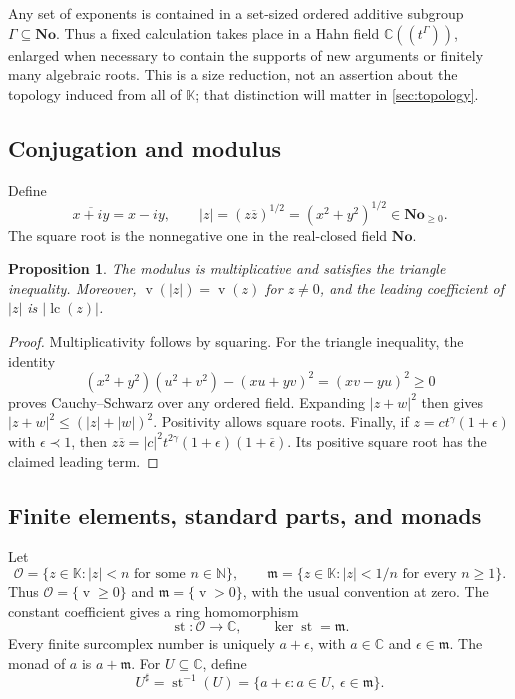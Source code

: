 \documentclass[11pt,letterpaper]{article}
\numberwithin{equation}{section}
\newtheorem{proposition}[theorem]{Proposition}
\theoremstyle{definition}
\theoremstyle{remark}
\newcommand{\No}{\mathbf{No}}
\newcommand{\K}{\mathbb{K}}
\newcommand{\C}{\mathbb{C}}
\newcommand{\N}{\mathbb{N}}
\newcommand{\OO}{\mathcal{O}}
\newcommand{\mm}{\mathfrak{m}}
\newcommand{\st}{\operatorname{st}}
\newcommand{\val}{\operatorname{v}}
\newcommand{\lead}{\operatorname{lc}}
\begin{document}
Any set of exponents is contained in a set-sized ordered additive subgroup
$\Gamma\subseteq\No$. Thus a fixed calculation takes place in a Hahn field
$\C((t^\Gamma))$, enlarged when necessary to contain the supports of new
arguments or finitely many algebraic roots. This is a size reduction, not an
assertion about the topology induced from all of $\K$; that distinction will
matter in \cref{sec:topology}.

\subsection{Conjugation and modulus}

Define
\[
 \overline{x+iy}=x-iy,\qquad
 |z|=(z\overline z)^{1/2}=(x^2+y^2)^{1/2}\in\No_{\ge0}.
\]
The square root is the nonnegative one in the real-closed field $\No$.

\begin{proposition}\label{prop:modulus}
The modulus is multiplicative and satisfies the triangle inequality. Moreover,
$\val(|z|)=\val(z)$ for $z\ne0$, and the leading coefficient of $|z|$ is
$|\lead(z)|$.
\end{proposition}
\begin{proof}
Multiplicativity follows by squaring. For the triangle inequality, the
identity
\[
 (x^2+y^2)(u^2+v^2)-(xu+yv)^2=(xv-yu)^2\ge0
\]
proves Cauchy--Schwarz over any ordered field. Expanding $|z+w|^2$ then gives
$|z+w|^2\le(|z|+|w|)^2$. Positivity allows square roots. Finally, if
$z=ct^\gamma(1+\epsilon)$ with $\epsilon\prec1$, then
$z\overline z=|c|^2t^{2\gamma}(1+\epsilon)(1+\overline\epsilon)$.
Its positive square root has the claimed leading term.
\end{proof}

\subsection{Finite elements, standard parts, and monads}

Let
\[
 \OO=\{z\in\K:|z|<n\text{ for some }n\in\N\},\qquad
 \mm=\{z\in\K:|z|<1/n\text{ for every }n\ge1\}.
\]
Thus $\OO=\{\val\ge0\}$ and $\mm=\{\val>0\}$, with the usual convention at
zero. The constant coefficient gives a ring homomorphism
\[
 \st:\OO\longrightarrow\C,
 \qquad \ker\st=\mm.
\]
Every finite surcomplex number is uniquely $a+\epsilon$, with $a\in\C$ and
$\epsilon\in\mm$. The monad of $a$ is $a+\mm$. For $U\subseteq\C$, define
\begin{equation}\label{eq:halo}
 U^\sharp=\st^{-1}(U)=\{a+\epsilon:a\in U,\ \epsilon\in\mm\}.
\end{equation}
\end{document}
